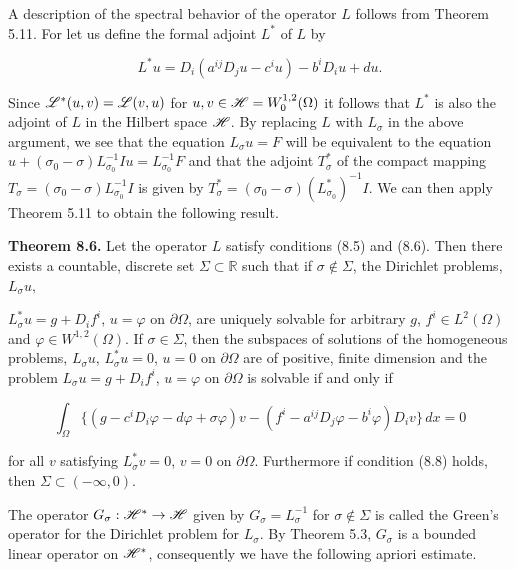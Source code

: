 A description of the spectral behavior of the operator $L$ follows from Theorem 5.11. For let us define the formal adjoint $L^*$ of $L$ by

\begin{equation}
\tag{8.14}
L^*u = D_i(a^{ij}D_j u - c^i u) - b^i D_i u + du.
\end{equation}

Since $\mathscr{L}^*(u,v) = \mathscr{L}(v,u)$ for $u, v \in \mathscr{H} = W_0^{1,2}(\Omega)$ it follows that $L^*$ is also the adjoint of $L$ in the Hilbert space $\mathscr{H}$. By replacing $L$ with $L_\sigma$ in the above argument, we see that the equation $L_\sigma u = F$ will be equivalent to the equation $u + (\sigma_0 - \sigma)L_{\sigma_0}^{-1} Iu = L_{\sigma_0}^{-1}F$ and that the adjoint $T_\sigma^*$ of the compact mapping $T_\sigma = (\sigma_0 - \sigma)L_{\sigma_0}^{-1} I$ is given by $T_\sigma^* = (\sigma_0 - \sigma)(L_{\sigma_0}^*)^{-1} I$. We can then apply Theorem 5.11 to obtain the following result.

\textbf{Theorem 8.6.} Let the operator $L$ satisfy conditions (8.5) and (8.6). Then there exists a countable, discrete set $\Sigma \subset \mathbb{R}$ such that if $\sigma \notin \Sigma$, the Dirichlet problems, $L_\sigma u,$



$L_{\sigma}^{*}u=g+D_i f^i$, $u=\varphi$ on $\partial\Omega$, are uniquely solvable for arbitrary $g$, $f^i\in L^2(\Omega)$ and $\varphi\in W^{1,2}(\Omega)$. If $\sigma\in\Sigma$, then the subspaces of solutions of the homogeneous problems, $L_{\sigma}u$, $L_{\sigma}^{*}u=0$, $u=0$ on $\partial\Omega$ are of positive, finite dimension and the problem $L_{\sigma}u=g+D_i f^i$, $u=\varphi$ on $\partial\Omega$ is solvable if and only if

\begin{equation}
\tag{8.15}
\int_{\Omega}\bigl\{(g-c^iD_i\varphi-d\varphi+\sigma\varphi)v-(f^i-a^{ij}D_j\varphi-b^i\varphi)D_iv\bigr\}\,dx=0
\end{equation}

for all $v$ satisfying $L_{\sigma}^{*}v=0$, $v=0$ on $\partial\Omega$. Furthermore if condition (8.8) holds, then $\Sigma\subset(-\infty,0)$.

The operator $G_{\sigma}:\mathscr{H}^{*}\to\mathscr{H}$ given by $G_{\sigma}=L_{\sigma}^{-1}$ for $\sigma\notin\Sigma$ is called the Green's operator for the Dirichlet problem for $L_{\sigma}$. By Theorem 5.3, $G_{\sigma}$ is a bounded linear operator on $\mathscr{H}^{*}$, consequently we have the following apriori estimate.

